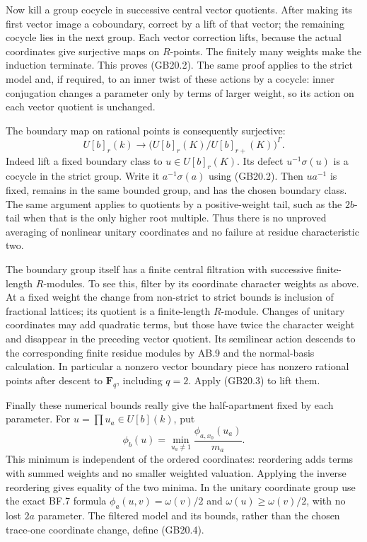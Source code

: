 \documentclass[
  11pt,
]{article}
\begin{document}
Now kill a group cocycle in successive central vector quotients. After
making its first vector image a coboundary, correct by a lift of that
vector; the remaining cocycle lies in the next group. Each vector
correction lifts, because the actual coordinates give surjective maps on
\(R\)-points. The finitely many weights make the induction terminate.
This proves (GB20.2). The same proof applies to the strict model and, if
required, to an inner twist of these actions by a cocycle: inner
conjugation changes a parameter only by terms of larger weight, so its
action on each vector quotient is unchanged.

The boundary map on rational points is consequently surjective: \[
 U[b]_r(k)\longrightarrow
     \bigl(U[b]_r(K)/U[b]_{r+}(K)\bigr)^\Gamma .             \tag{GB20.3}
\] Indeed lift a fixed boundary class to \(u\in U[b]_r(K)\). Its defect
\(u^{-1}\sigma(u)\) is a cocycle in the strict group. Write it
\(a^{-1}\sigma(a)\) using (GB20.2). Then \(ua^{-1}\) is fixed, remains
in the same bounded group, and has the chosen boundary class. The same
argument applies to quotients by a positive-weight tail, such as the
\(2b\)-tail when that is the only higher root multiple. Thus there is no
unproved averaging of nonlinear unitary coordinates and no failure at
residue characteristic two.

The boundary group itself has a finite central filtration with
successive finite-length \(R\)-modules. To see this, filter by its
coordinate character weights as above. At a fixed weight the change from
non-strict to strict bounds is inclusion of fractional lattices; its
quotient is a finite-length \(R\)-module. Changes of unitary coordinates
may add quadratic terms, but those have twice the character weight and
disappear in the preceding vector quotient. Its semilinear action
descends to the corresponding finite residue modules by AB.9 and the
normal-basis calculation. In particular a nonzero vector boundary piece
has nonzero rational points after descent to \(\mathbf F_q\), including
\(q=2\). Apply (GB20.3) to lift them.

Finally these numerical bounds really give the half-apartment fixed by
each parameter. For \(u=\prod u_a\in U[b](k)\), put \[
                 \phi_b(u)=
                   \min_{u_a\ne1}
                           \frac{\phi_{a,x_0}(u_a)}{m_a}.
                                                               \tag{GB20.4}
\] This minimum is independent of the ordered coordinates: reordering
adds terms with summed weights and no smaller weighted valuation.
Applying the inverse reordering gives equality of the two minima. In the
unitary coordinate group use the exact BF.7 formula
\(\phi_a(u,v)=\omega(v)/2\) and \(\omega(u)\geq\omega(v)/2\), with no
lost \(2a\) parameter. The filtered model and its bounds, rather than
the chosen trace-one coordinate change, define (GB20.4).
\end{document}
